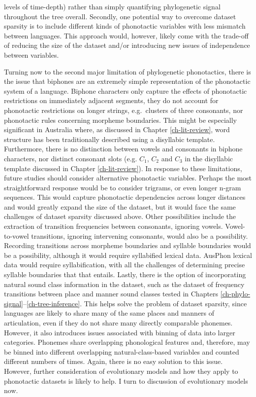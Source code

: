 levels of time-depth) rather than simply quantifying phylogenetic signal throughout the tree overall. Secondly, one potential way to overcome dataset sparsity is to include different kinds of phonotactic variables with less mismatch between languages. This approach would, however, likely come with the trade-off of reducing the size of the dataset and/or introducing new issues of independence between variables.

Turning now to the second major limitation of phylogenetic phonotactics, there is the issue that biphones are an extremely simple representation of the phonotactic system of a language. Biphone characters only capture the effects of phonotactic restrictions on immediately adjacent segments, they do not account for phonotactic restrictions on longer strings, e.g.~clusters of three consonants, nor phonotactic rules concerning morpheme boundaries. This might be especially significant in Australia where, as discussed in Chapter \ref{ch-lit-review}, word structure has been traditionally described using a disyllabic template. Furthermore, there is no distinction between vowels and consonants in biphone characters, nor distinct consonant slots (e.g. \(C_1\), \(C_2\) and \(C_3\) in the disyllabic template discussed in Chapter \ref{ch-lit-review}). In response to these limitations, future studies should consider alternative phonotactic variables. Perhaps the most straightforward response would be to consider trigrams, or even longer n-gram sequences. This would capture phonotactic dependencies across longer distances and would greatly expand the size of the dataset, but it would face the same challenges of dataset sparsity discussed above. Other possibilities include the extraction of transition frequencies between consonants, ignoring vowels. Vowel-to-vowel transitions, ignoring intervening consonants, would also be a possibility. Recording transitions across morpheme boundaries and syllable boundaries would be a possibility, although it would require syllabified lexical data. AusPhon lexical data would require syllabification, with all the challenges of determining precise syllable boundaries that that entails. Lastly, there is the option of incorporating natural sound class information in the dataset, such as the dataset of frequency transitions between place and manner sound classes tested in Chapters \ref{ch-phylo-signal}--\ref{ch-tree-inference}. This helps solve the problem of dataset sparsity, since languages are likely to share many of the same places and manners of articulation, even if they do not share many directly comparable phonemes. However, it also introduces issues associated with binning of data into larger categories. Phonemes share overlapping phonological features and, therefore, may be binned into different overlapping natural-class-based variables and counted different numbers of times. Again, there is no easy solution to this issue. However, further consideration of evolutionary models and how they apply to phonotactic datasets is likely to help. I turn to discussion of evolutionary models now.

